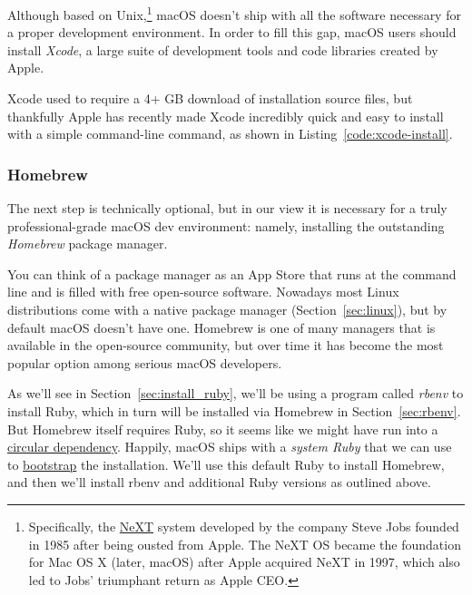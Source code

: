 Although based on Unix,\footnote{Specifically, the \href{https://en.wikipedia.org/wiki/NeXT}{NeXT} system developed by the company Steve Jobs founded in 1985 after being ousted from Apple. The NeXT OS became the foundation for Mac OS X (later, macOS) after Apple acquired NeXT in 1997, which also led to Jobs' triumphant return as Apple CEO\@.} macOS doesn't ship with all the software necessary for a proper development environment. In order to fill this gap, macOS users should install \emph{Xcode}, a large suite of development tools and code libraries created by Apple.

Xcode used to require a 4+ GB download of installation source files, but thankfully Apple has recently made Xcode incredibly quick and easy to install with a simple command-line command, as shown in Listing~\ref{code:xcode-install}.

\begin{codelisting}
\label{code:xcode-install}
\end{codelisting}


\subsubsection{Homebrew}
\label{sec:homebrew}

The next step is technically optional, but in our view it is necessary for a truly professional-grade macOS dev environment: namely, installing the outstanding \emph{Homebrew} package manager.

You can think of a package manager as an App Store that runs at the command line and is filled with free open-source software. Nowadays most Linux distributions come with a native package manager (Section~\ref{sec:linux}), but by default macOS doesn't have one. Homebrew is one of many managers that is available in the open-source community, but over time it has become the most popular option among serious macOS developers.

As we'll see in Section~\ref{sec:install_ruby}, we'll be using a program called \emph{rbenv} to install Ruby, which in turn will be installed via Homebrew in Section~\ref{sec:rbenv}. But Homebrew itself requires Ruby, so it seems like we might have run into a \href{https://en.wikipedia.org/wiki/Circular_dependency}{circular dependency}. Happily, macOS ships with a \emph{system Ruby} that we can use to \href{https://en.wikipedia.org/wiki/Bootstrapping}{bootstrap} the installation. We'll use this default Ruby to install Homebrew, and then we'll install rbenv and additional Ruby versions as outlined above.

